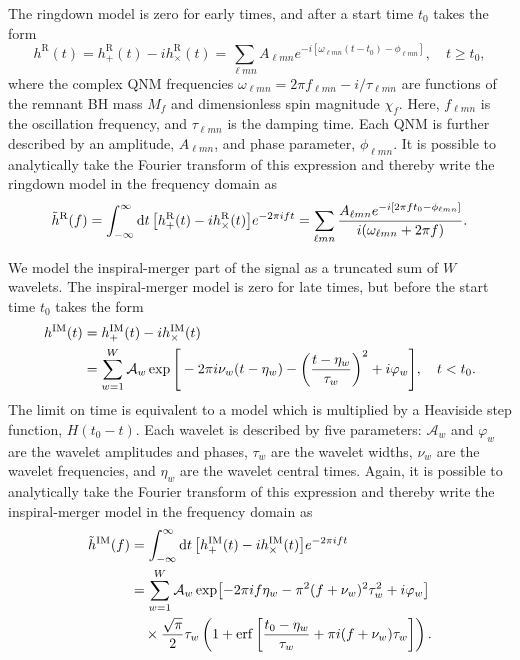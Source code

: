 The ringdown model is zero for early times, and after a start time $t_0$ takes the form
\begin{equation}\label{ch3:eq:hr}
    h^\mathrm{R}(t) = h_+^\mathrm{R}(t) - ih_\times^\mathrm{R}(t) = \sum_{\ell m n} A_{\ell m n} e^{-i[\omega_{\ell m n}(t-t_0) - \phi_{\ell m n}]}, \quad t \geq t_0,
\end{equation}
where the complex QNM frequencies $\omega_{\ell m n} = 2\pi f_{\ell m n} - i/\tau_{\ell m n}$ are functions of the remnant BH mass $M_f$ and dimensionless spin magnitude $\chi_f$. Here, $f_{\ell m n}$ is the oscillation frequency, and $\tau_{\ell m n}$ is the damping time.
Each QNM is further described by an amplitude, $A_{\ell m n}$, and phase parameter, $\phi_{\ell m n}$. 
It is possible to analytically take the Fourier transform of this expression and thereby write the ringdown model in the frequency domain as
\begin{equation}\label{ch3:eq:hr_fd}
    \Tilde{h}^{\mathrm{R}}(f) = \int_{-\infty}^\infty \dd{t} \qty[h_+^\mathrm{R}(t) - ih_\times^\mathrm{R}(t)] e^{-2\pi i f t} = \sum_{\ell m n} \frac{A_{\ell m n} e^{-i[2\pi ft_0 - \phi_{\ell m n}]}}{i(\omega_{\ell m n} + 2\pi f)}.
\end{equation}

We model the inspiral-merger part of the signal as a truncated sum of $W$ wavelets.
The inspiral-merger model is zero for late times, but before the start time $t_0$ takes the form
\begin{align}
	h^\mathrm{IM}(t) &=  h_+^\mathrm{IM}(t) - ih_\times^\mathrm{IM}(t) \nonumber \\
	&= \sum_{w=1}^{W} \mathcal{A}_w \exp \Bigg[-2\pi i \nu_w(t-\eta_w) - \qty(\frac{t-\eta_w}{\tau_w})^2 + i\varphi_w \Bigg], \quad t < t_0.
\end{align}
The limit on time is equivalent to a model which is multiplied by a Heaviside step function, $H(t_0 - t)$. Each wavelet is described by five parameters: $\mathcal{A}_w$ and $\varphi_w$ are the wavelet amplitudes and phases, $\tau_w$ are the wavelet widths, $\nu_w$ are the wavelet frequencies, and $\eta_w$ are the wavelet central times. Again, it is possible to analytically take the Fourier transform of this expression and thereby write the inspiral-merger model in the frequency domain as
\begin{align}\label{ch3:eq:him_fd}
	\Tilde{h}^\mathrm{IM}(f) &= \int_{-\infty}^\infty \dd{t} \qty[h_+^\mathrm{IM}(t) - ih_\times^\mathrm{IM}(t)] e^{-2\pi i f t} \\
	&= \sum_{w=1}^{W} \mathcal{A}_w \exp[-2\pi if \eta_w -\pi^2(f+\nu_w)^2\tau_w^2 +i\varphi_w] \nonumber\\
	&\quad\times \frac{\sqrt{\pi}}{2}\tau_w \left(1 + \mathrm{erf} \left[ \frac{t_0-\eta_w}{\tau_w} + \pi i(f+\nu_w)\tau_w \right] \right).\nonumber
\end{align}

